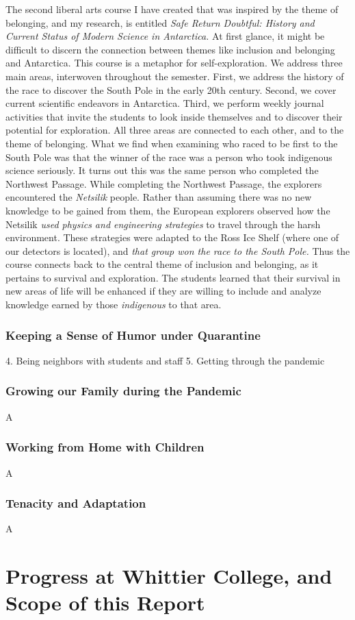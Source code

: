 \documentclass[../../main.tex]{subfiles}
\begin{document}
The second liberal arts course I have created that was inspired by the theme of belonging, and my research, is entitled \textit{Safe Return Doubtful: History and Current Status of Modern Science in Antarctica.}  At first glance, it might be difficult to discern the connection between themes like inclusion and belonging and Antarctica.  This course is a metaphor for self-exploration.  We address three main areas, interwoven throughout the semester.  First, we address the history of the race to discover the South Pole in the early 20th century.  Second, we cover current scientific endeavors in Antarctica.  Third, we perform weekly journal activities that invite the students to look inside themselves and to discover their potential for exploration.  All three areas are connected to each other, and to the theme of belonging.  What we find when examining who raced to be first to the South Pole was that the winner of the race was a person who took indigenous science seriously.  It turns out this was the same person who completed the Northwest Passage.  While completing the Northwest Passage, the explorers encountered the \textit{Netsilik} people.  Rather than assuming there was no new knowledge to be gained from them, the European explorers observed how the Netsilik \textit{used physics and engineering strategies} to travel through the harsh environment.  These strategies were adapted to the Ross Ice Shelf (where one of our detectors is located), and \textit{that group won the race to the South Pole.}  Thus the course connects back to the central theme of inclusion and belonging, as it pertains to survival and exploration.  The students learned that their survival in new areas of life will be enhanced if they are willing to include and analyze knowledge earned by those \textit{indigenous} to that area.

\subsubsection{Keeping a Sense of Humor under Quarantine}

4. Being neighbors with students and staff
5. Getting through the pandemic

\subsubsection{Growing our Family during the Pandemic}

A

\subsubsection{Working from Home with Children}

A

\subsubsection{Tenacity and Adaptation}

A

\section{Progress at Whittier College, and Scope of this Report}
\end{document}
